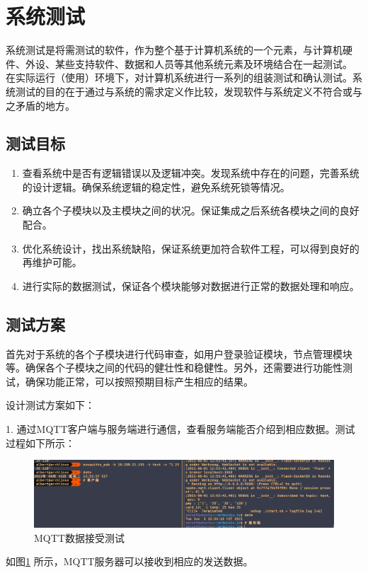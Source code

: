 \section{系统测试}

系统测试是将需测试的软件，作为整个基于计算机系统的一个元素，与计算机硬件、外设、某些支持软件、数据和人员等其他系统元素及环境结合在一起测试。 在实际运行（使用）环境下，对计算机系统进行一系列的组装测试和确认测试。系统测试的目的在于通过与系统的需求定义作比较，发现软件与系统定义不符合或与之矛盾的地方。

\subsection{测试目标}

\begin{enumerate}
	\item 查看系统中是否有逻辑错误以及逻辑冲突。发现系统中存在的问题，完善系统的设计逻辑。确保系统逻辑的稳定性，避免系统死锁等情况。
	\item 确立各个子模块以及主模块之间的状况。保证集成之后系统各模块之间的良好配合。
	\item 优化系统设计，找出系统缺陷，保证系统更加符合软件工程，可以得到良好的再维护可能。
	\item 进行实际的数据测试，保证各个模块能够对数据进行正常的数据处理和响应。
\end{enumerate}

\subsection{测试方案}

首先对于系统的各个子模块进行代码审查，如用户登录验证模块，节点管理模块等。确保各个子模块之间的代码的健壮性和稳健性。另外，还需要进行功能性测试，确保功能正常，可以按照预期目标产生相应的结果。

设计测试方案如下：
 
1. 通过MQTT客户端与服务端进行通信，查看服务端能否介绍到相应数据。测试过程如下所示：
\begin{figure}[htbp]
	\centering
	\includegraphics[width=0.85\linewidth]{figure/test-1}
	\caption{MQTT数据接受测试}
	\label{fig:6-1}
\end{figure}
如图\ref*{fig:6-1} 所示，MQTT服务器可以接收到相应的发送数据。

